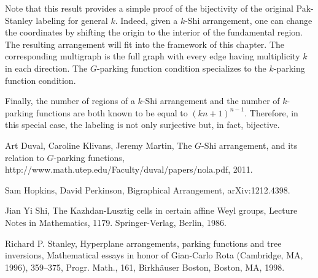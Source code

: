 \documentclass[12pt]{amsart}
\theoremstyle{definition}
\begin{document}
Note that this result provides a simple proof of the bijectivity of the original Pak-Stanley labeling for general $k.$ Indeed, given a $k$-Shi arrangement, one can change the coordinates by shifting the origin to the interior of the fundamental region. The resulting arrangement will fit into the framework of this chapter. The corresponding multigraph is the full graph with every edge having multiplicity $k$ in each direction. The $G$-parking function condition specializes to the $k$-parking function condition.

Finally, the number of regions of a $k$-Shi arrangement and the number of $k$-parking functions are both known to be equal to $(kn+1)^{n-1}.$ Therefore, in this special case, the labeling is not only surjective but, in fact, bijective.

\begin{thebibliography}{99}

  Art Duval, Caroline Klivans, Jeremy Martin, The $G$-Shi
arrangement, and its relation to $G$-parking functions, http://www.math.utep.edu/Faculty/duval/papers/nola.pdf, 2011.

 Sam Hopkins, David Perkinson, Bigraphical Arrangement, arXiv:1212.4398.

 Jian Yi Shi, The Kazhdan-Lusztig cells in certain affine Weyl groups, Lecture Notes in Mathematics, 1179. Springer-Verlag, Berlin, 1986.

 Richard P. Stanley, Hyperplane arrangements, parking functions and tree inversions, Mathematical essays in honor of Gian-Carlo Rota (Cambridge, MA, 1996), 359–375, 
Progr. Math., 161, Birkhäuser Boston, Boston, MA, 1998. 

\end{thebibliography}
\end{document}

